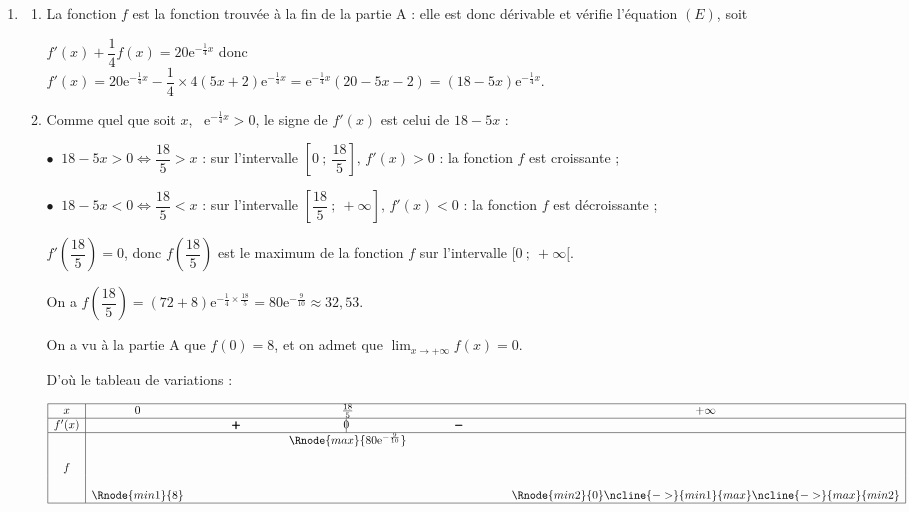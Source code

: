 \documentclass[10pt]{article}
\providecommand{\e}{{\mathrm{e}}}
\begin{document}
\begin{enumerate}
\item 
	\begin{enumerate}
		\item 


La fonction $f$ est la fonction trouvée à la fin de la partie A : elle est donc dérivable et vérifie l'équation $(E)$, soit 

$f'(x) + \dfrac14 f(x) = 20\e^{-\frac14 x}$ donc \\
$f'(x) = 20\e^{-\frac14 x} - \dfrac14 \times 4(5x + 2)\e^{-\frac14 x} = \e^{-\frac14 x}(20 - 5x - 2) = (18 - 5x)\e^{-\frac14 x}$.

		\item 
		Comme quel que soit $x$, \, $\e^{-\frac14 x} > 0$, le signe de $f'(x)$ est celui de $18 - 5x$ :
		
$\bullet~$ $18 - 5x > 0 \iff \dfrac{18}{5} > x$ : sur l'intervalle $\left[0~;~\dfrac{18}{5}\right], \, f'(x) > 0$ : la fonction $f$ est croissante ;

$\bullet~$ $18 - 5x < 0 \iff \dfrac{18}{5} < x$ : sur l'intervalle $\left[\dfrac{18}{5}~;~+ \infty\right], \, f'(x) < 0$ : la fonction $f$ est décroissante ;

$f'\left(\dfrac{18}{5}\right) = 0$, donc $f\left(\dfrac{18}{5}\right)$ est le maximum de la fonction $f$ sur l'intervalle $[0~;~ +\infty[$.

On a $f\left(\dfrac{18}{5}\right) = (72 + 8)\e^{-\frac14 \times \frac{18}{5}} = 80\e^{-\frac{9}{10}} \approx 32,53$.

On a vu à la partie A que $f(0) = 8$, et on admet que $\displaystyle\lim_{x \to + \infty}f(x) = 0$. 

D'où le tableau de variations :

\begin{center}
{\renewcommand{\arraystretch}{1.3}
\def\esp{\hspace*{2.5cm}}
\def\hauteur{20pt}
$\begin{array}{|c|*5{c}|}
\hline
x & 0  & \esp & \frac{18}{5} & \esp & +\infty \\ 
\hline
f'(x) &  &   \pmb{+} & \vline\hspace{-2.7pt}0 & \pmb{-} & \\ 
\hline
 & &  &   \Rnode{max}{80 \e^{-\frac{9}{10}}}  &  &   \\  
f & &     &  &  &  \rule{0pt}{\hauteur} \\ 
 & \Rnode{min1}{8} &   &  &  &   \Rnode{min2}{0} \rule{0pt}{\hauteur}    
 \ncline{->}{min1}{max} 
 \ncline{->}{max}{min2} 
 \\ 
\hline
\end{array} $
}
\end{center}	


\end{enumerate}
\end{enumerate}
\end{document}
